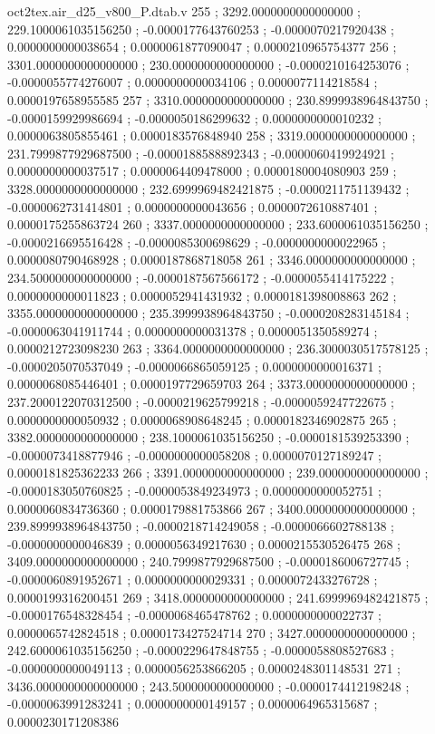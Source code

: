 \begin{filecontents}[overwrite]{oct2tex.air_d25_v800_P.dtab.v}
255 ; 3292.0000000000000000 ; 229.1000061035156250 ; -0.0000177643760253 ; -0.0000070217920438 ; 0.0000000000038654 ; 0.0000061877090047 ; 0.0000210965754377
256 ; 3301.0000000000000000 ; 230.0000000000000000 ; -0.0000210164253076 ; -0.0000055774276007 ; 0.0000000000034106 ; 0.0000077114218584 ; 0.0000197658955585
257 ; 3310.0000000000000000 ; 230.8999938964843750 ; -0.0000159929986694 ; -0.0000050186299632 ; 0.0000000000010232 ; 0.0000063805855461 ; 0.0000183576848940
258 ; 3319.0000000000000000 ; 231.7999877929687500 ; -0.0000188588892343 ; -0.0000060419924921 ; 0.0000000000037517 ; 0.0000064409478000 ; 0.0000180004080903
259 ; 3328.0000000000000000 ; 232.6999969482421875 ; -0.0000211751139432 ; -0.0000062731414801 ; 0.0000000000043656 ; 0.0000072610887401 ; 0.0000175255863724
260 ; 3337.0000000000000000 ; 233.6000061035156250 ; -0.0000216695516428 ; -0.0000085300698629 ; -0.0000000000022965 ; 0.0000080790468928 ; 0.0000187868718058
261 ; 3346.0000000000000000 ; 234.5000000000000000 ; -0.0000187567566172 ; -0.0000055414175222 ; 0.0000000000011823 ; 0.0000052941431932 ; 0.0000181398008863
262 ; 3355.0000000000000000 ; 235.3999938964843750 ; -0.0000208283145184 ; -0.0000063041911744 ; 0.0000000000031378 ; 0.0000051350589274 ; 0.0000212723098230
263 ; 3364.0000000000000000 ; 236.3000030517578125 ; -0.0000205070537049 ; -0.0000066865059125 ; 0.0000000000016371 ; 0.0000068085446401 ; 0.0000197729659703
264 ; 3373.0000000000000000 ; 237.2000122070312500 ; -0.0000219625799218 ; -0.0000059247722675 ; 0.0000000000050932 ; 0.0000068908648245 ; 0.0000182346902875
265 ; 3382.0000000000000000 ; 238.1000061035156250 ; -0.0000181539253390 ; -0.0000073418877946 ; -0.0000000000058208 ; 0.0000070127189247 ; 0.0000181825362233
266 ; 3391.0000000000000000 ; 239.0000000000000000 ; -0.0000183050760825 ; -0.0000053849234973 ; 0.0000000000052751 ; 0.0000060834736360 ; 0.0000179881753866
267 ; 3400.0000000000000000 ; 239.8999938964843750 ; -0.0000218714249058 ; -0.0000066602788138 ; -0.0000000000046839 ; 0.0000056349217630 ; 0.0000215530526475
268 ; 3409.0000000000000000 ; 240.7999877929687500 ; -0.0000186006727745 ; -0.0000060891952671 ; 0.0000000000029331 ; 0.0000072433276728 ; 0.0000199316200451
269 ; 3418.0000000000000000 ; 241.6999969482421875 ; -0.0000176548328454 ; -0.0000068465478762 ; 0.0000000000022737 ; 0.0000065742824518 ; 0.0000173427524714
270 ; 3427.0000000000000000 ; 242.6000061035156250 ; -0.0000229647848755 ; -0.0000058808527683 ; -0.0000000000049113 ; 0.0000056253866205 ; 0.0000248301148531
271 ; 3436.0000000000000000 ; 243.5000000000000000 ; -0.0000174412198248 ; -0.0000063991283241 ; 0.0000000000149157 ; 0.0000064965315687 ; 0.0000230171208386

\end{filecontents}
